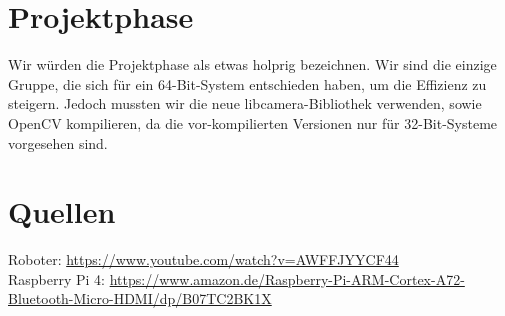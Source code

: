 \documentclass[12pt, a4paper]{article}
\begin{document}
	\section{Projektphase}
	Wir würden die Projektphase als etwas holprig bezeichnen. Wir sind die einzige Gruppe, die sich für ein 64-Bit-System entschieden haben, um die Effizienz zu steigern. Jedoch mussten wir die neue libcamera-Bibliothek verwenden, sowie OpenCV kompilieren, da die vor-kompilierten Versionen nur für 32-Bit-Systeme vorgesehen sind.  
	\section{Quellen}
	Roboter: \url{https://www.youtube.com/watch?v=AWFFJYYCF44}
	\\
	Raspberry Pi 4: \url{https://www.amazon.de/Raspberry-Pi-ARM-Cortex-A72-Bluetooth-Micro-HDMI/dp/B07TC2BK1X}
	
\end{document}
